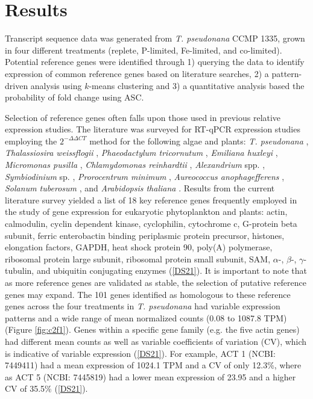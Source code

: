 \section{Results}
Transcript sequence data was generated from \textit{T. pseudonana} CCMP 1335, grown in four different treatments (replete, P-limited, Fe-limited, and co-limited). Potential reference genes were identified through 1) querying the data to identify expression of common reference genes based on literature searches, 2) a pattern-driven analysis using $k$-means clustering \citep{Hartigan1979} and 3) a quantitative analysis based the probability of fold change using ASC. \par
Selection of reference genes often falls upon those used in previous relative expression studies. The literature was surveyed for RT-qPCR expression studies employing the $2^{- \Delta \Delta CT}$ method for the following algae and plants: \textit{T. pseudonana} \citep{Maldonado2006, McGinn2008, McGinn2008a, Mock2008, Park2008, Carvalho2011, Whitney2011a}, \textit{Thalassiosira weissflogii} \citep{Davis2006, McGinn2008, Park2008, Whitney2011a}, \textit{Phaeodactylum tricornutum} \citep{Siaut2007, McGinn2008}, \textit{Emiliana huxleyi} \citep{Bruhn2010, Richier2010}, \textit{Micromonas pusilla} \citep{McDonald2010}, \textit{Chlamydomonas reinhardtii} \citep{Moseley2006, Zhao2009}, \textit{Alexandrium} spp. \citep{Lee2009, Moustafa2010}, \textit{Symbiodinium} sp. \citep{Rosic2010, Rosic2010a, Leggat2011}, \textit{Prorocentrum minimum} \citep{Guo2012}, \textit{Aureococcus anophagefferens} \citep{Berg2008, Wurch2011}, \textit{Solanum tuberosum} \citep{Nicot2005}, and \textit{Arabidopsis thaliana} \citep{Avonce2004}. Results from the current literature survey yielded a list of 18 key reference genes frequently employed in the study of gene expression for eukaryotic phytoplankton and plants: actin, calmodulin, cyclin dependent kinase, cyclophilin, cytochrome c, G-protein beta subunit, ferric enterobactin binding periplasmic protein precursor, histones, elongation factors, GAPDH, heat shock protein 90, poly(A) polymerase, ribosomal protein large subunit, ribosomal protein small subunit, SAM, $\alpha$-, $\beta$-, $\gamma$-tubulin, and ubiquitin conjugating enzymes (\ref{DS21}). It is important to note that as more reference genes are validated as stable, the selection of putative reference genes may expand. The 101 genes identified as homologous to these reference genes across the four treatments in \textit{T. pseudonana} had variable expression patterns and a wide range of mean normalized counts (0.08 to 1087.8 TPM) (Figure \ref{fig:c2f1}). Genes within a specific gene family (e.g. the five actin genes) had different mean counts as well as variable coefficients of variation (CV), which is indicative of variable expression (\ref{DS21}). For example, ACT 1 (NCBI: 7449411) had a mean expression of 1024.1 TPM and a CV of only 12.3\%, where as ACT 5 (NCBI: 7445819) had a lower mean expression of 23.95 and a higher CV of 35.5\% (\ref{DS21}). \par

